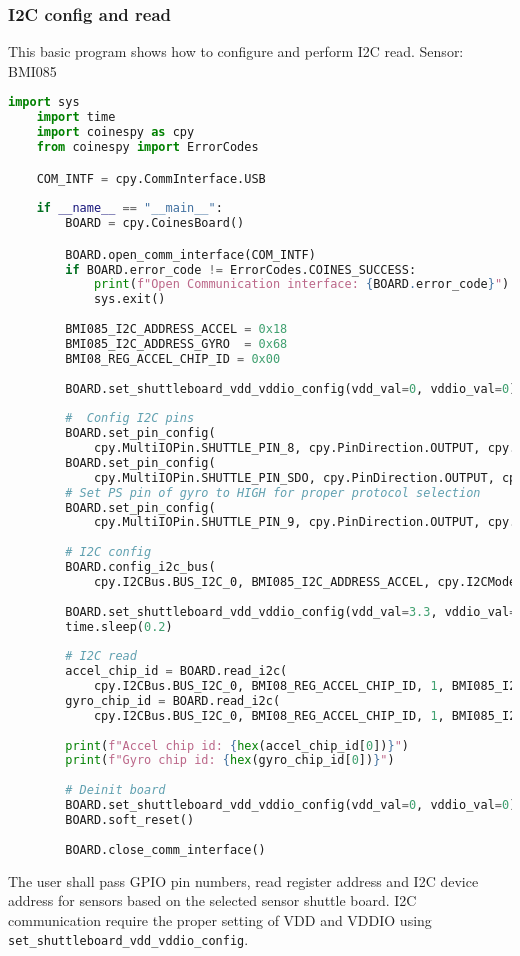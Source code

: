 \documentclass{article}
\begin{document}
\subsubsection{I2C config and read}
This basic program shows how to configure and perform I2C read.
\newline Sensor: BMI085
\begin{lstlisting}[language=python]
	import sys
	import time
	import coinespy as cpy
	from coinespy import ErrorCodes

	COM_INTF = cpy.CommInterface.USB
	
	if __name__ == "__main__":
		BOARD = cpy.CoinesBoard()

		BOARD.open_comm_interface(COM_INTF)
		if BOARD.error_code != ErrorCodes.COINES_SUCCESS:
			print(f"Open Communication interface: {BOARD.error_code}")
			sys.exit()
	
		BMI085_I2C_ADDRESS_ACCEL = 0x18
		BMI085_I2C_ADDRESS_GYRO  = 0x68
		BMI08_REG_ACCEL_CHIP_ID = 0x00
	
		BOARD.set_shuttleboard_vdd_vddio_config(vdd_val=0, vddio_val=0)
	
		#  Config I2C pins
		BOARD.set_pin_config(
			cpy.MultiIOPin.SHUTTLE_PIN_8, cpy.PinDirection.OUTPUT, cpy.PinValue.LOW)
		BOARD.set_pin_config(
			cpy.MultiIOPin.SHUTTLE_PIN_SDO, cpy.PinDirection.OUTPUT, cpy.PinValue.LOW)
		# Set PS pin of gyro to HIGH for proper protocol selection
		BOARD.set_pin_config(
			cpy.MultiIOPin.SHUTTLE_PIN_9, cpy.PinDirection.OUTPUT, cpy.PinValue.HIGH)
	
		# I2C config
		BOARD.config_i2c_bus(
			cpy.I2CBus.BUS_I2C_0, BMI085_I2C_ADDRESS_ACCEL, cpy.I2CMode.STANDARD_MODE)
	
		BOARD.set_shuttleboard_vdd_vddio_config(vdd_val=3.3, vddio_val=3.3)
		time.sleep(0.2)
	
		# I2C read
		accel_chip_id = BOARD.read_i2c(
			cpy.I2CBus.BUS_I2C_0, BMI08_REG_ACCEL_CHIP_ID, 1, BMI085_I2C_ADDRESS_ACCEL)
		gyro_chip_id = BOARD.read_i2c(
			cpy.I2CBus.BUS_I2C_0, BMI08_REG_ACCEL_CHIP_ID, 1, BMI085_I2C_ADDRESS_GYRO)
	
		print(f"Accel chip id: {hex(accel_chip_id[0])}")
		print(f"Gyro chip id: {hex(gyro_chip_id[0])}")
	
		# Deinit board
		BOARD.set_shuttleboard_vdd_vddio_config(vdd_val=0, vddio_val=0)
		BOARD.soft_reset()
	
		BOARD.close_comm_interface()	
\end{lstlisting}
The user shall pass GPIO pin numbers, read register address and I2C device address for sensors based on the selected sensor shuttle board. I2C communication require the proper setting of VDD and VDDIO using \texttt{set\_shuttleboard\_vdd\_vddio\_config}.
\end{document}

